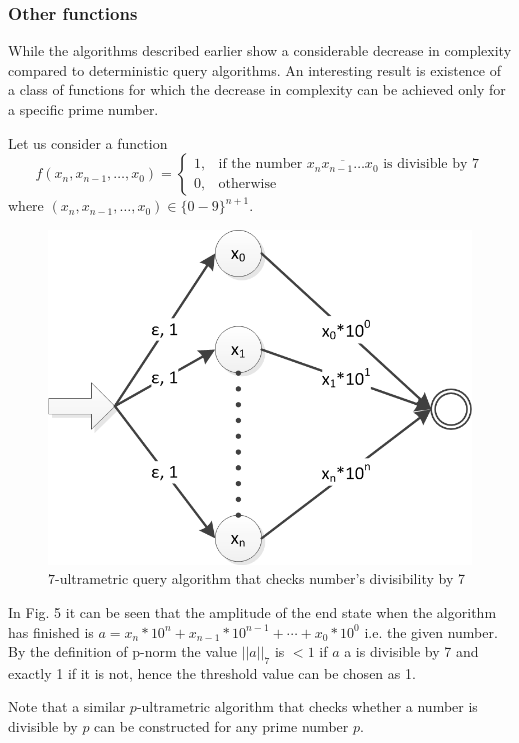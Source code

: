 \documentclass{llncs}
\begin{document}
\subsubsection{Other functions}
While the algorithms described earlier show a considerable decrease in complexity compared to deterministic query algorithms. An interesting result is existence of a class of functions for which the decrease in complexity can be achieved only for a specific prime number.

Let us consider a function
$$
f(x_n,x_{n-1},\dots,x_0)=\begin{cases}
1, & \text{if the number } \overline{x_nx_{n-1}\dots x_0} \text{ is divisible by 7} \\
0, & \text{otherwise}
\end{cases}
$$
where $(x_n,x_{n-1},\dots,x_0) \in \{0-9\}^{n+1}$.
\begin{figure}
	\centering
	\includegraphics{divisibility.png}
	\caption{$7$-ultrametric query algorithm that checks number's divisibility by 7}
	  \label{div}
\end{figure}

In Fig. 5 it can be seen that the amplitude of the end state when the algorithm has finished is $a=x_n*10^n+x_{n-1}*10^{n-1}+\cdots+x_0*10^0$ i.e. the given number. By the definition of p-norm the value $||a||_7$ is $<1$ if $a$ a is divisible by 7 and exactly 1 if it is not, hence the threshold value can be chosen as 1.

Note that a similar $p$-ultrametric algorithm that checks whether a number is divisible by $p$ can be constructed for any prime number $p$.
%




\end{document}

